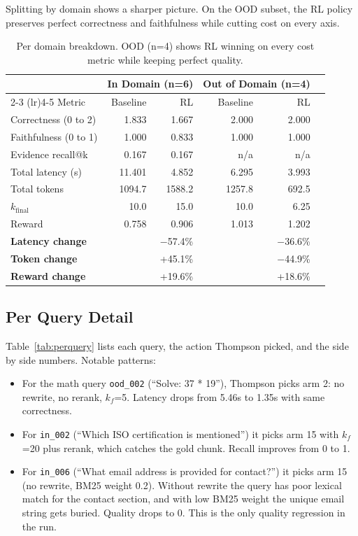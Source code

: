 \documentclass{article}
\begin{document}
Splitting by domain shows a sharper picture. On the OOD subset, the RL policy preserves perfect correctness and faithfulness while cutting cost on every axis.

\begin{table}[h]
\centering
\caption{Per domain breakdown. OOD (n=4) shows RL winning on every cost metric while keeping perfect quality.}
\label{tab:perdomain}
\small
\begin{tabular}{lrrrrr}
\toprule
 & \multicolumn{2}{c}{In Domain (n=6)} & \multicolumn{2}{c}{Out of Domain (n=4)} \\
\cmidrule(lr){2-3} \cmidrule(lr){4-5}
Metric & Baseline & RL & Baseline & RL \\
\midrule
Correctness (0 to 2)      & 1.833   & 1.667   & 2.000  & 2.000  \\
Faithfulness (0 to 1)     & 1.000   & 0.833   & 1.000  & 1.000  \\
Evidence recall@k         & 0.167   & 0.167   & n/a    & n/a    \\
Total latency (s)         & 11.401  & 4.852   & 6.295  & 3.993  \\
Total tokens              & 1094.7  & 1588.2  & 1257.8 & 692.5  \\
$k_{\text{final}}$        & 10.0    & 15.0    & 10.0   & 6.25   \\
Reward                    & 0.758   & 0.906   & 1.013  & 1.202  \\
\midrule
\textbf{Latency change}   &         & $-$57.4\% &       & $-$36.6\% \\
\textbf{Token change}     &         & +45.1\%   &       & $-$44.9\% \\
\textbf{Reward change}    &         & +19.6\%   &       & +18.6\% \\
\bottomrule
\end{tabular}
\end{table}

\subsection{Per Query Detail}

Table~\ref{tab:perquery} lists each query, the action Thompson picked, and the side by side numbers. Notable patterns:

\begin{itemize}
    \item For the math query \texttt{ood\_002} (``Solve: 37 * 19''), Thompson picks arm 2: no rewrite, no rerank, $k_f$=5. Latency drops from 5.46s to 1.35s with same correctness.
    \item For \texttt{in\_002} (``Which ISO certification is mentioned'') it picks arm 15 with $k_f$=20 plus rerank, which catches the gold chunk. Recall improves from 0 to 1.
    \item For \texttt{in\_006} (``What email address is provided for contact?'') it picks arm 15 (no rewrite, BM25 weight 0.2). Without rewrite the query has poor lexical match for the contact section, and with low BM25 weight the unique email string gets buried. Quality drops to 0. This is the only quality regression in the run.
\end{itemize}
\end{document}
